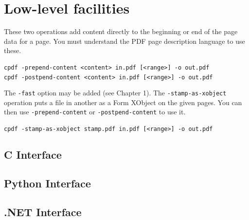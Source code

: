\documentclass{book}
\begin{document}
\section{Low-level facilities}

These two operations add content directly to the beginning or end of the page data for a page. You must understand the PDF page description language to use these.

\begin{framed}
  \noindent\small\verb!cpdf -prepend-content <content> in.pdf [<range>] -o out.pdf!\\

\vspace{1.5mm}
  \noindent\small\verb!cpdf -postpend-content <content> in.pdf [<range>] -o out.pdf!
\end{framed}

\noindent The \texttt{-fast} option may be added (see Chapter 1). The \texttt{-stamp-as-xobject} operation puts a file in another as a Form XObject on the given pages. You can then use \texttt{-prepend-content} or \texttt{-postpend-content} to use it.

\begin{framed}
  \noindent\small\verb!cpdf -stamp-as-xobject stamp.pdf in.pdf [<range>] -o out.pdf!
\end{framed}

\begin{cpdflib}
\clearpage
\section*{C Interface}
\begin{small}\tt

\end{small}
\end{cpdflib}

\begin{pycpdflib}
\clearpage
\section*{Python Interface}
\begin{small}\tt

\end{small}
\end{pycpdflib}

\begin{dotnetcpdflib}
\clearpage
\section*{.NET Interface}
\begin{small}\tt

\end{small}
\end{dotnetcpdflib}
\end{document}
